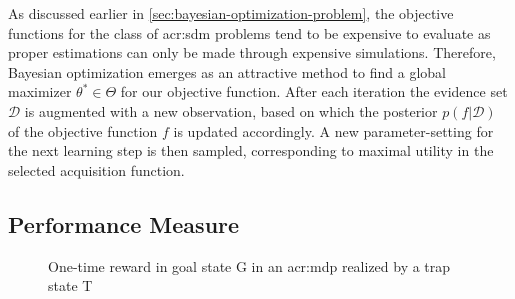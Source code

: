 As discussed earlier in  \autoref{sec:bayesian-optimization-problem}, the objective functions for the class of \acrshort{acr:sdm} problems tend to be expensive to evaluate as proper estimations can only be made through expensive simulations.
Therefore, Bayesian optimization emerges as an attractive method to find a global maximizer $\theta^\ast \in \Theta$ for our objective function.
After each iteration the evidence set $\mathcal{D}$ is augmented with a new observation, based on which the posterior $p(f\vert \mathcal{D})$ of the objective function $f$ is updated accordingly.
A new parameter-setting for the next learning step is then sampled, corresponding to maximal utility in the selected acquisition function.


\subsection{Performance Measure}
\label{sec:performance-measure}

\begin{figure}[t!]
\centering
{}
\caption{One-time reward in goal state G in an \acrshort{acr:mdp} realized by a trap state T}
\label{fig:goal-trap-state}
\end{figure}

